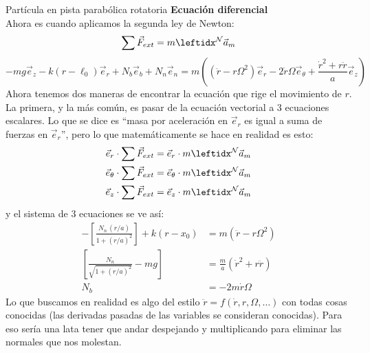 \begin{solucion}{Partícula en pista parabólica rotatoria}
\textbf{Ecuación diferencial}\\
Ahora es cuando aplicamos la segunda ley de Newton:
$$\sum\vec{F}_{ext}=m\marc{\vec{a}_m}{N}$$
$$-mg\vec{e}_z-k(r-\ell_0)\vec{e}_r+N_b\vec{e}_b+N_n\vec{e}_n=m\left((\ddot{r}-r\Omega^2)\vec{e}_r-2\dot r\Omega\vec{e}_{\theta}+\dfrac{\dot r^2+r\ddot r}{a}\vec{e}_z\right)$$
Ahora tenemos dos maneras de encontrar la ecuación que rige el movimiento de $r$. La primera, y la más común, es pasar de la ecuación vectorial a 3 ecuaciones escalares. Lo que se dice es ``masa por aceleración en $\vec{e}_r$ es igual a suma de fuerzas en $\vec{e}_r$'', pero lo que matemáticamente se hace en realidad es esto:
\begin{equation*}
\begin{split}
   \vec{e}_r\cdot \sum\vec{F}_{ext}&=\vec{e}_r\cdot m\marc{\vec{a}_m}{N}\\
   \vec{e}_\theta\cdot \sum\vec{F}_{ext}&=\vec{e}_\theta\cdot m\marc{\vec{a}_m}{N}\\
   \vec{e}_z \cdot \sum\vec{F}_{ext}&=\vec{e}_z\cdot m\marc{\vec{a}_m}{N}
\end{split}
\end{equation*}
y el sistema de 3 ecuaciones se ve así:
\begin{align*}
- \left[ \frac{N_n \, (r/a)}{1 + (r/a)^2} \right] + k (r - x_0) &= m \left( \ddot{r} - r \Omega^2 \right) \\[1em]
\left[ \frac{N_n}{\sqrt{1 + (r/a)^2}} - mg \right] &= \frac{m}{a} \left( \dot{r}^2 + r \ddot{r} \right) \\[1em]
N_b &= -2m \dot{r} \Omega
\end{align*}
Lo que buscamos en realidad es algo del estilo $\ddot r=f(\dot r,r,\Omega,\dots)$ con todas cosas conocidas (las derivadas pasadas de las variables se consideran conocidas). Para eso sería una lata tener que andar despejando y multiplicando para eliminar las normales que nos molestan.



\end{solucion}
